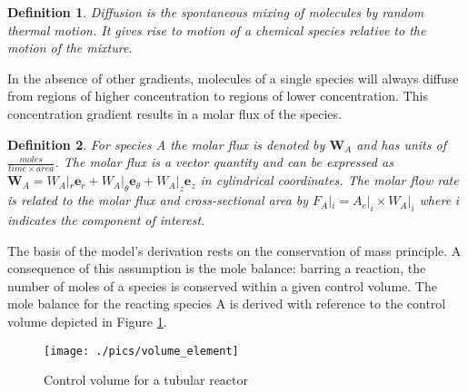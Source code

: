 \documentclass[11pt,fleqn]{article}
\theoremstyle{defstyle}
\newtheorem{defn}{Definition}[section]
\begin{document}
\begin{defn}
Diffusion is the spontaneous mixing of molecules by random thermal motion. It gives rise to motion of a chemical species relative to the motion of the mixture.
\end{defn}

In the absence of other gradients, molecules of a single species will always diffuse from regions of higher concentration to regions of lower concentration. This concentration gradient results in a molar flux of the species.

\begin{defn}
For species A the molar flux is denoted by $\mathbf{W}_A$ and has units of $\frac{moles}{time \times area}$. The molar flux is a vector quantity and can be expressed as $\mathbf{W}_A = W_A|_r \mathbf{e}_r + W_A|_\theta \mathbf{e}_\theta + W_A|_z \mathbf{e}_z$ in cylindrical coordinates. The molar flow rate is related to the molar flux and cross-sectional area by $F_A|_i = A_c|_i \times W_A|_i$ where $i$ indicates the component of interest. 
\end{defn}

The basis of the model's derivation rests on the conservation of mass principle. A consequence of this assumption is the mole balance: barring a reaction, the number of moles of a species is conserved within a given control volume. The mole balance for the reacting species A is derived with reference to the control volume depicted in Figure \ref{fig_vol_element}.

\begin{figure}[H] 
\centering
\texttt{[image: ./pics/volume\_element]}
\caption{Control volume for a tubular reactor} 
\label{fig_vol_element}
\end{figure}
\end{document}

